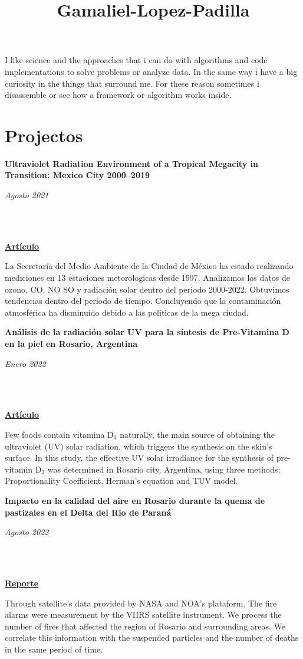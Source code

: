 \documentclass[a3paper]{adcv_color}
\title{Gamaliel-Lopez-Padilla}
\newcommand{\proyect}[3]{\begin{minipage}{1\linewidth}
    \begin{minipage}{0.8\linewidth}
      \textbf{#1}
    \end{minipage}
    \begin{minipage}{0.19\linewidth}
      \begin{flushright}
        \vspace{#3cm}
        \textit{#2}
      \end{flushright}
    \end{minipage}\\
  \end{minipage}
  \vspace{0.1cm}\\
}
\begin{document}
\changefontsizes{15.5pt}
I like science and the approaches that i can do with algorithms and code implementations to solve problems or analyze data. In the same way i have a big curiosity in the things that surround me. For these reason sometimes i disassemble or see how a framework or algorithm works inside.

\section{Projectos}
\begin{multicols}{2}

  \proyect{Ultraviolet Radiation Environment of a Tropical Megacity in Transition: Mexico City 2000–2019}{Agosto 2021}{-0.6}
  \href{https://pubs.acs.org/doi/10.1021/acs.est.0c08515}{\textbf{Artículo}}

  La Secretaría del Medio Ambiente de la Ciudad de México ha estado realizando mediciones en 13 estaciones metorologicas desde 1997. Analizamos los datos de ozono, CO, NO SO y radiación solar dentro del periodo 2000-2022. Obtuvimos tendencias dentro del periodo de tiempo. Concluyendo que la contaminación atmosférica ha disminuido debido a las politicas de la mega ciudad.


  \proyect{Análisis de la radiación solar UV para la síntesis de Pre-Vitamina D en la piel en Rosario, Argentina}{Enero 2022}{-0.8}
  \href{https://anales.fisica.org.ar/journal/index.php/analesafa/article/view/2318}{\textbf{Artículo}}

  Few  foods  contain  vitamina  D$_3$ naturally,  the  main  source  of  obtaining  the  ultraviolet (UV) solar radiation, which triggers the synthesis on the skin’s surface. In this study, the effective UV solar irradiance for the synthesis of pre-vitamin D$_3$ was determined in Rosario city, Argentina, using three methods: Proportionality Coefficient, Herman’s equation and TUV model.\\

  \proyect{Impacto en la calidad del aire en Rosario durante la quema de pastizales en el Delta del Rio de Paraná}{Agosto 2022}{-0.6}
  \href{https://rephip.unr.edu.ar/handle/2133/24201}{\textbf{Reporte}}

  Through satellite's data provided by NASA and NOA's plataform. The fire alarms were measurement by the VIIRS satellite instrument. We process the number of fires that affected the region of Rosario and surrounding areas. We correlate this information with the suspended particles and the number of deaths in the same period of time.\\


\end{multicols}
\end{document}
